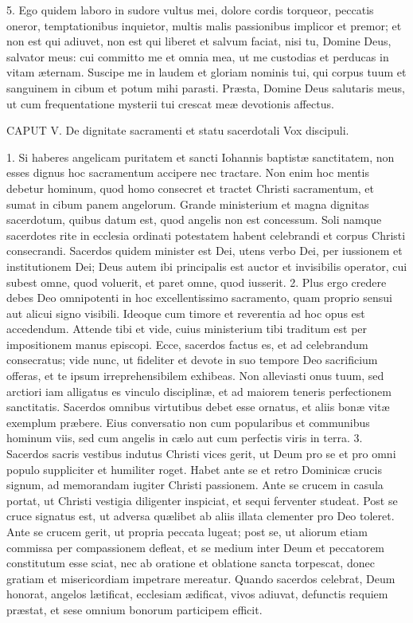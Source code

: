 5. Ego quidem laboro in sudore vultus mei, dolore cordis torqueor, peccatis oneror, temptationibus inquietor, multis malis passionibus implicor et premor; et non est qui adiuvet, non est qui liberet et salvum faciat, nisi tu, Domine Deus, salvator meus: cui committo me et omnia mea, ut me custodias et perducas in vitam æternam. Suscipe me in laudem et gloriam nominis tui, qui corpus tuum et sanguinem in cibum et potum mihi parasti. Præsta, Domine Deus salutaris meus, ut cum frequentatione mysterii tui crescat meæ devotionis affectus.


CAPUT V.
De dignitate sacramenti et statu sacerdotali
Vox discipuli.

1. Si haberes angelicam puritatem et sancti Iohannis baptistæ sanctitatem, non esses dignus hoc sacramentum accipere nec tractare. Non enim hoc mentis debetur hominum, quod homo consecret et tractet Christi sacramentum, et sumat in cibum panem angelorum. Grande ministerium et magna dignitas sacerdotum, quibus datum est, quod angelis non est concessum. Soli namque sacerdotes rite in ecclesia ordinati potestatem habent celebrandi et corpus Christi consecrandi. Sacerdos quidem minister est Dei, utens verbo Dei, per iussionem et institutionem Dei; Deus autem ibi principalis est auctor et invisibilis operator, cui subest omne, quod voluerit, et paret omne, quod iusserit.
2. Plus ergo credere debes Deo omnipotenti in hoc excellentissimo sacramento, quam proprio sensui aut alicui signo visibili. Ideoque cum timore et reverentia ad hoc opus est accedendum. Attende tibi et vide, cuius ministerium tibi traditum est per impositionem manus episcopi. Ecce, sacerdos factus es, et ad celebrandum consecratus; vide nunc, ut fideliter et devote in suo tempore Deo sacrificium offeras, et te ipsum irreprehensibilem exhibeas. Non alleviasti onus tuum, sed arctiori iam alligatus es vinculo disciplinæ, et ad maiorem teneris perfectionem sanctitatis. Sacerdos omnibus virtutibus debet esse ornatus, et aliis bonæ vitæ exemplum præbere. Eius conversatio non cum popularibus et communibus hominum viis, sed cum angelis in cælo aut cum perfectis viris in terra.
3. Sacerdos sacris vestibus indutus Christi vices gerit, ut Deum pro se et pro omni populo suppliciter et humiliter roget. Habet ante se et retro Dominicæ crucis signum, ad memorandam iugiter Christi passionem. Ante se crucem in casula portat, ut Christi vestigia diligenter inspiciat, et sequi ferventer studeat. Post se cruce signatus est, ut adversa quælibet ab aliis illata clementer pro Deo toleret. Ante se crucem gerit, ut propria peccata lugeat; post se, ut aliorum etiam commissa per compassionem defleat, et se medium inter Deum et peccatorem constitutum esse sciat, nec ab oratione et oblatione sancta torpescat, donec gratiam et misericordiam impetrare mereatur. Quando sacerdos celebrat, Deum honorat, angelos lætificat, ecclesiam ædificat, vivos adiuvat, defunctis requiem præstat, et sese omnium bonorum participem efficit.


